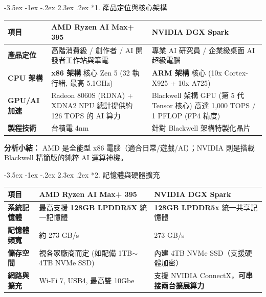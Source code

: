 \documentclass[14pt, a4paper, landscape]{extarticle}
\makeatletter
\renewcommand\section{\@startsection {section}{1}{\z@}%
                                   {-3.5ex \@plus -1ex \@minus -.2ex}%
                                   {2.3ex \@plus.2ex}%
                                   {\normalfont\Large\bfseries\color{white}}}
\makeatother
\begin{document}
\section*{1. 產品定位與核心架構}
\vspace{0.5cm}

\renewcommand{\arraystretch}{1.8}
\begin{tabularx}{\textwidth}{l X X}
\toprule
\textbf{項目} & \textcolor{amdred}{\textbf{AMD Ryzen AI Max+ 395}} & \textcolor{nvgreen}{\textbf{NVIDIA DGX Spark}} \\
\midrule
\textbf{產品定位} & 高階消費級 / 創作者 / AI 開發者工作站與筆電 & 專業 AI 研究員 / 企業級桌面 AI 超級電腦 \\
\textbf{CPU 架構} & \textbf{x86 架構} \newline 16 核心 Zen 5 (32 執行緒, 最高 5.1GHz) & \textbf{ARM 架構} \newline 20 核心 (10x Cortex-X925 + 10x A725) \\
\textbf{GPU/AI加速} & Radeon 8060S (RDNA) + XDNA2 NPU \newline 總計提供約 126 TOPS 的 AI 算力 & Blackwell 架構 GPU (第 5 代 Tensor 核心) \newline 高達 1,000 TOPS / 1 PFLOP (FP4 精度) \\
\textbf{製程技術} & 台積電 4nm & 針對 Blackwell 架構特製化晶片 \\
\bottomrule
\end{tabularx}

\vspace{1cm}
\textbf{分析小結：} \textcolor{amdred}{AMD} 是全能型 x86 電腦（適合日常/遊戲/AI）；\textcolor{nvgreen}{NVIDIA} 則是搭載 Blackwell 精簡版的純粹 AI 運算神機。
\clearpage

\section*{2. 記憶體與硬體擴充}
\vspace{0.5cm}

\renewcommand{\arraystretch}{1.8}
\begin{tabularx}{\textwidth}{l X X}
\toprule
\textbf{項目} & \textcolor{amdred}{\textbf{AMD Ryzen AI Max+ 395}} & \textcolor{nvgreen}{\textbf{NVIDIA DGX Spark}} \\
\midrule
\textbf{系統記憶體} & 最高支援 \textbf{128GB LPDDR5X} 統一記憶體 & \textbf{128GB LPDDR5x} 統一共享記憶體 \\
\textbf{記憶體頻寬} & 約 273 GB/s & 273 GB/s \\
\textbf{儲存空間} & 視各家廠商而定 (如配備 1TB$\sim$4TB NVMe SSD) & 內建 4TB NVMe SSD（支援硬體加密） \\
\textbf{網路與擴充} & Wi-Fi 7, USB4, 最高雙 10Gbe & 支援 NVIDIA ConnectX，\textbf{可串接兩台擴展算力} \\
\bottomrule
\end{tabularx}
\end{document}
